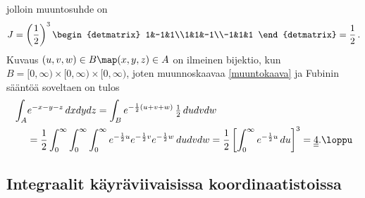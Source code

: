 jolloin muuntosuhde on
\[
J = \left(\frac{1}{2}\right)^3 \begin{detmatrix} 1&-1&1\\1&1&-1\\-1&1&1 \end{detmatrix} 
  = \frac{1}{2}\,.
\] 
Kuvaus $(u,v,w) \in B \map (x,y,z) \in A$ on ilmeinen bijektio, kun
$B = [0,\infty)\times[0,\infty)\times[0,\infty)$, joten muunnoskaavaa \eqref{muuntokaava}
ja Fubinin sääntöä soveltaen on tulos
\begin{align*} 
\int_A &e^{-x-y-z}\,dxdydz = \int_B e^{-\frac{1}{2}(u+v+w)}\,\tfrac{1}{2}\,dudvdw \\ 
       &= \frac{1}{2}\int_0^\infty\int_0^\infty\int_0^\infty 
           e^{-\frac{1}{2}u}e^{-\frac{1}{2}v}e^{-\frac{1}{2}w}\,dudvdw
        = \frac{1}{2}\left[\int_0^\infty e^{-\frac{1}{2}u}\,du\right]^3 
        = \underline{\underline{4}}. \loppu
\end{align*}

\subsection*{Integraalit käyräviivaisissa koordinaatistoissa}

